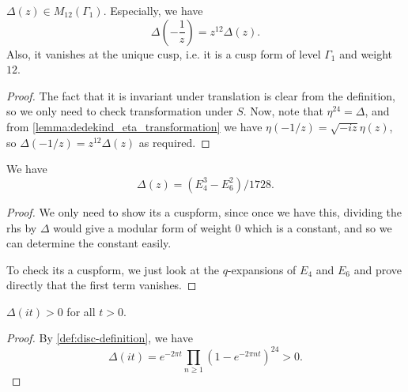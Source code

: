 \begin{lemma}\label{lemma:disc-cuspform}\leanok{}
$\Delta(z) \in M_{12}(\Gamma_1)$.
Especially, we have
\begin{equation}\label{eqn:disc-trans-S}
    \Delta\left(-\frac{1}{z}\right) = z^{12} \Delta(z).
\end{equation}
Also, it vanishes at the unique cusp, i.e. it is a cusp form of level $\Gamma_1$ and weight $12$.
\end{lemma}
\begin{proof}
    \leanok
The fact that it is invariant under translation is clear from the definition, so we only need to check transformation under $S$. Now, note that $\eta^{24} = \Delta$, and from \ref{lemma:dedekind_eta_transformation} we have $\eta(-1/z) = \sqrt{-iz} \eta(z)$, so $\Delta(-1/z) = z^{12} \Delta(z)$ as required.

\end{proof}



\begin{lemma}\label{lemma:disc-E4E6}\leanok{}
We have
\begin{equation}
\Delta(z) = (E_4^3-E_6^2)/1728.
\end{equation}
\end{lemma}
\begin{proof}
We only need to show its a cuspform, since once we have this, dividing the rhs by $\Delta$ would give a modular form of weight $0$ which is a constant, and so we can determine the constant easily.

To check its a cuspform, we just look at  the $q$-expansions of $E_4$ and $E_6$ and prove directly that the first term vanishes.
\end{proof}


\begin{corollary}\label{cor:disc-pos}  \leanok {}
$\Delta(it) > 0$ for all $t > 0$.
\end{corollary}
\begin{proof}
By \ref{def:disc-definition}, we have
$$
\Delta(it) = e^{-2 \pi t} \prod_{n \ge 1} (1 - e^{-2 \pi n t})^{24} > 0.
$$
\end{proof}


